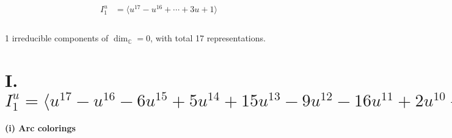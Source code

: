 \documentclass[1p]{elsarticle_modified}
\theoremstyle{definition}
\begin{document}
\begin{align*}
I^u_{1}&=\langle 
u^{17}- u^{16}+\cdots+3 u+1\rangle \\
\\
\end{align*}
\raggedright * 1 irreducible components of $\dim_{\mathbb{C}}=0$, with total 17 representations.\\
\newpage
\renewcommand{\arraystretch}{1}
\centering \section*{I. $I^u_{1}= \langle u^{17}- u^{16}-6 u^{15}+5 u^{14}+15 u^{13}-9 u^{12}-16 u^{11}+2 u^{10}- u^9+13 u^8+18 u^7-12 u^6-12 u^5-4 u^4-2 u^3+6 u^2+3 u+1 \rangle$}
\flushleft \textbf{(i) Arc colorings}\\
\end{document}
